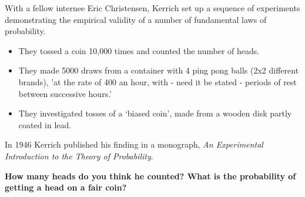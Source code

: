 \documentclass[t,xcolor=pdftex,dvipsnames,table]{beamer}
\begin{document}
\begin{frame}{}


With a fellow internee Eric Christensen, Kerrich set up a sequence of experiments demonstrating the empirical validity of a number of fundamental laws of probability.

\begin{itemize}
\item They tossed a coin 10,000 times and counted the number of heads. \\
\item They made 5000 draws from a container with 4  ping pong balls (2x2 different brands), 'at the rate of 400 an hour, with - need it be stated - periods of rest between successive hours.'
\item They investigated tosses of a `biased coin', made from a wooden disk partly coated in lead.
\end{itemize}

In 1946 Kerrich published his finding in a monograph, {\it An
Experimental Introduction to the Theory of Probability}. 
\href{http://www.maths.usyd.edu.au/u/UG/JM/MATH1005/r/StatsData/Kerrich1950.pdf}{}

\vspace{.5cm}
{\bf How many heads do you think he counted? What is the probability of getting a head on a fair coin?}

\end{frame}
\end{document}
